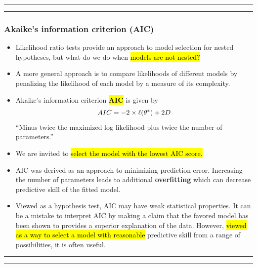 \documentclass[]{article}
\begin{document}
\begin{center}\rule{0.5\linewidth}{\linethickness}\end{center}

\begin{center}\rule{0.5\linewidth}{\linethickness}\end{center}

\subsubsection{Akaike's information criterion
(AIC)}\label{akaikes-information-criterion-aic}

\begin{itemize}
\item
  Likelihood ratio tests provide an approach to model selection for
  nested hypotheses, but what do we do when \hl{models are not nested?}
\item
  A more general approach is to compare likelihoods of different models
  by penalizing the likelihood of each model by a measure of its
  complexity.
\item
  Akaike's information criterion \hl{\textbf{AIC}} is given by
  \[ AIC = -2 \times \ell(\theta^*) + 2D\] ``Minus twice the
  maximized log likelihood plus twice the number of parameters.''
\item
  We are invited to \hl{select the model with the lowest AIC score.}
\item
  AIC was derived as an approach to minimizing prediction error.
  Increasing the number of parameters leads to additional
  \textbf{overfitting} which can decrease predictive skill of the fitted
  model.
\item
  Viewed as a hypothesis test, AIC may have weak statistical properties.
  It can be a mistake to interpret AIC by making a claim that the
  favored model has been shown to provides a superior explanation of the
  data. However, \hl{viewed as a way to select a model with reasonable}
  predictive skill from a range of possibilities, it is often useful.
\end{itemize}


\begin{center}\rule{0.5\linewidth}{\linethickness}\end{center}

\begin{center}\rule{0.5\linewidth}{\linethickness}\end{center}
\end{document}
